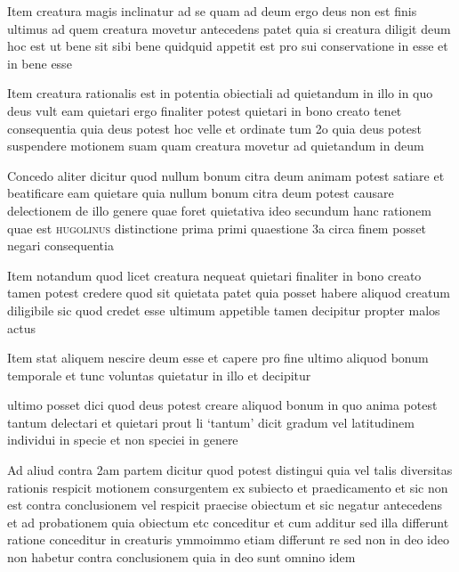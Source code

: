 \documentclass[twoside, openright]{article}
\newcommand{\name}[1]{\textsc{#1}}
\begin{document}
        \pstart
        Item creatura magis inclinatur ad se quam ad deum ergo deus non est finis ultimus ad quem creatura movetur antecedens patet quia si creatura diligit deum hoc est ut bene sit sibi bene quidquid appetit est pro sui conservatione in esse et in bene esse
        \pend
     
        \pstart
        Item creatura rationalis est in potentia obiectiali ad quietandum in illo in quo deus vult eam quietari ergo finaliter potest quietari in bono creato tenet consequentia quia deus potest hoc velle et ordinate tum 2o quia deus potest suspendere motionem suam quam creatura movetur ad quietandum in deum
        \pend
     
        \pstart
        Concedo aliter dicitur quod nullum bonum citra deum animam potest satiare et beatificare eam quietare quia nullum bonum citra deum potest causare delectionem de illo genere quae foret quietativa ideo secundum hanc rationem quae est \name{hugolinus} distinctione prima primi quaestione 3a circa finem posset negari consequentia
        \pend
     
        \pstart
        Item notandum quod licet creatura nequeat quietari finaliter in bono creato tamen potest credere quod sit quietata patet quia posset habere aliquod creatum diligibile sic quod credet esse ultimum appetible tamen decipitur propter malos actus
        \pend
     
        \pstart
        Item stat aliquem nescire deum esse et capere pro fine ultimo aliquod bonum temporale et tunc voluntas quietatur in illo et decipitur
        \pend
     
        \pstart
        ultimo posset dici quod deus potest creare aliquod bonum in quo anima potest tantum delectari et quietari prout li \enquote*{tantum} dicit gradum vel latitudinem individui in specie et non speciei in genere
        \pend
     
        \pstart
        Ad aliud contra 2am partem dicitur quod potest distingui quia vel talis diversitas rationis respicit motionem consurgentem ex subiecto et praedicamento et sic non est contra conclusionem vel respicit praecise obiectum et sic negatur antecedens et ad probationem quia obiectum etc conceditur et cum additur sed illa differunt ratione conceditur in creaturis ymmoimmo etiam differunt re sed non in deo ideo non habetur contra conclusionem quia in deo sunt omnino idem
        \pend
     
\end{document}
